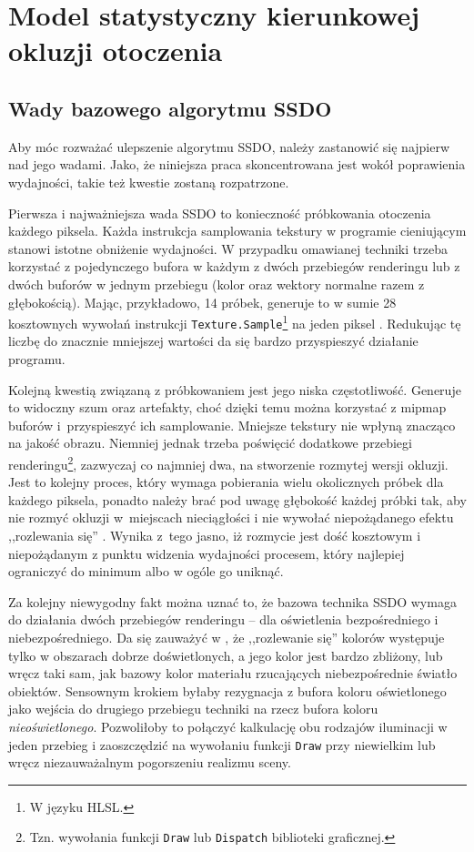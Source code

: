 \chapter{Model statystyczny kierunkowej okluzji otoczenia}
\label{t:algorytm}


	\section{Wady bazowego algorytmu SSDO}
	\label{t:algorytm:wady-ssdo}
	
	
	Aby móc rozważać ulepszenie algorytmu SSDO, należy zastanowić się najpierw nad jego wadami. Jako, że niniejsza praca skoncentrowana jest wokół poprawienia wydajności, takie też kwestie zostaną rozpatrzone.
	
	Pierwsza i najważniejsza wada SSDO to konieczność próbkowania otoczenia każdego piksela. Każda instrukcja samplowania tekstury w programie cieniującym stanowi istotne obniżenie wydajności. W przypadku omawianej techniki trzeba korzystać z pojedynczego bufora w każdym z dwóch przebiegów renderingu lub z dwóch buforów w jednym przebiegu (kolor oraz wektory normalne razem z głębokością). Mając, przykładowo, 14 próbek, generuje to w sumie 28 kosztownych wywołań instrukcji \texttt{Texture.Sample}\footnote{W języku HLSL.} na jeden piksel \cite{luna}. Redukując tę liczbę do znacznie mniejszej wartości da się bardzo przyspieszyć działanie programu.
	
	Kolejną kwestią związaną z próbkowaniem jest jego niska częstotliwość. Generuje to widoczny szum oraz artefakty, choć dzięki temu można korzystać z mipmap buforów i~przyspieszyć ich samplowanie. Mniejsze tekstury nie wpłyną znacząco na jakość obrazu. Niemniej jednak trzeba poświęcić dodatkowe przebiegi renderingu\footnote{Tzn. wywołania funkcji \texttt{Draw} lub \texttt{Dispatch} biblioteki graficznej.}, zazwyczaj co najmniej dwa, na stworzenie rozmytej wersji okluzji. Jest to kolejny proces, który wymaga pobierania wielu okolicznych próbek dla każdego piksela, ponadto należy brać pod uwagę głębokość każdej próbki tak, aby nie rozmyć okluzji w~miejscach nieciągłości i nie wywołać niepożądanego efektu ,,rozlewania się'' \cite{luna}. Wynika z~tego jasno, iż rozmycie jest dość kosztowym i niepożądanym z punktu widzenia wydajności procesem, który najlepiej ograniczyć do minimum albo w ogóle go uniknąć.
	
	Za kolejny niewygodny fakt można uznać to, że bazowa technika SSDO wymaga do działania dwóch przebiegów renderingu -- dla oświetlenia bezpośredniego i niebezpośredniego. Da się zauważyć w \cite{ssdo}, że ,,rozlewanie się'' kolorów występuje tylko w obszarach dobrze doświetlonych, a jego kolor jest bardzo zbliżony, lub wręcz taki sam, jak bazowy kolor materiału rzucających niebezpośrednie światło obiektów. Sensownym krokiem byłaby rezygnacja z bufora koloru oświetlonego jako wejścia do drugiego przebiegu techniki na rzecz bufora koloru \emph{nieoświetlonego}. Pozwoliłoby to połączyć kalkulację obu rodzajów iluminacji w jeden przebieg i zaoszczędzić na wywołaniu funkcji \texttt{Draw} przy niewielkim lub wręcz niezauważalnym pogorszeniu realizmu sceny.
	
